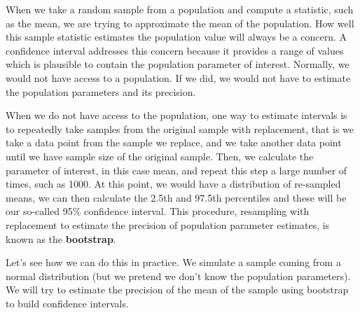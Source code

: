 \documentclass[12pt,]{krantz}
\begin{document}
When we take a random sample from a population and compute a statistic, such as
the mean, we are trying to approximate the mean of the population. How well this
sample statistic estimates the population value will always be a
concern. A confidence interval addresses this concern because it provides a
range of values which is plausible to contain the population parameter of interest.
Normally, we would not have access to a population. If we did, we would not have to estimate the population parameters and its precision.

When we do not have access
to the population, one way to estimate intervals is to repeatedly take samples from the
original sample with replacement, that is we take a data point from the sample
we replace, and we take another data point until we have sample size of the
original sample. Then, we calculate the parameter of interest, in this case mean, and
repeat this step a large number of times, such as 1000. At this point, we would have a distribution of re-sampled
means, we can then calculate the 2.5th and 97.5th percentiles and these will
be our so-called 95\% confidence interval. This procedure, resampling with replacement to
estimate the precision of population parameter estimates, is known as the \textbf{bootstrap}.

Let's see how we can do this in practice. We simulate a sample
coming from a normal distribution (but we pretend we don't know the
population parameters). We will try to estimate the precision
of the mean of the sample using bootstrap to build confidence intervals.
\end{document}
